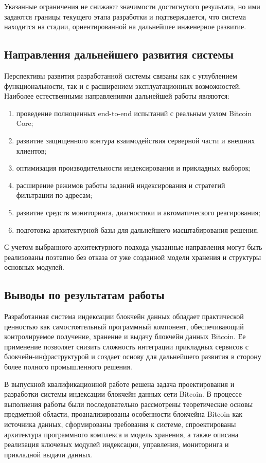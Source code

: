 Указанные ограничения не снижают значимости достигнутого результата, но
ими задаются границы текущего этапа разработки и подтверждается, что система
находится на стадии, ориентированной на дальнейшее инженерное развитие.

\subsection{Направления дальнейшего развития системы}

Перспективы развития разработанной системы связаны как с углублением
функциональности, так и с расширением эксплуатационных возможностей. Наиболее
естественными направлениями дальнейшей работы являются:
\begin{enumerate}
    \item проведение полноценных end-to-end испытаний с реальным узлом Bitcoin Core;
    \item развитие защищенного контура взаимодействия серверной части и внешних клиентов;
    \item оптимизация производительности индексирования и прикладных выборок;
    \item расширение режимов работы заданий индексирования и стратегий фильтрации по адресам;
    \item развитие средств мониторинга, диагностики и автоматического реагирования;
    \item подготовка архитектурной базы для дальнейшего масштабирования решения.
\end{enumerate}

С учетом выбранного архитектурного подхода указанные направления могут быть
реализованы поэтапно без отказа от уже созданной модели хранения и структуры
основных модулей.

\subsection{Выводы по результатам работы}

Разработанная система индексации блокчейн данных обладает практической ценностью
как самостоятельный программный компонент, обеспечивающий контролируемое
получение, хранение и выдачу блокчейн данных Bitcoin. Ее применение позволяет
снизить сложность интеграции прикладных сервисов с блокчейн-инфраструктурой и
создает основу для дальнейшего развития в сторону более полного промышленного
решения.

\conclusion

В выпускной квалификационной работе решена задача проектирования и разработки
системы индексации блокчейн данных сети Bitcoin. В процессе выполнения работы
были последовательно рассмотрены теоретические основы предметной области,
проанализированы особенности блокчейна Bitcoin как источника данных,
сформированы требования к системе, спроектированы архитектура программного
комплекса и модель хранения, а также описана реализация ключевых модулей
индексации, управления, мониторинга и прикладной выдачи данных.

